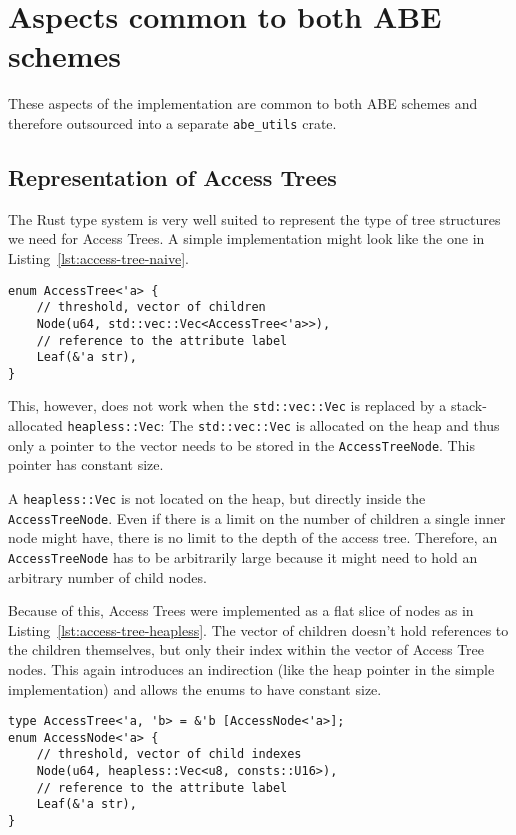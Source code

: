 \section{Aspects common to both ABE schemes}

These aspects of the implementation are common to both ABE schemes and therefore outsourced into a separate \verb+abe_utils+ crate.

\subsection{Representation of Access Trees}
The Rust type system is very well suited to represent the type of tree structures we need for Access Trees.
A simple implementation might look like the one in Listing~\ref{lst:access-tree-naive}. 

\begin{lstlisting}[caption={Simple Implementation of Access Trees (using the standard library)},label={lst:access-tree-naive}]
enum AccessTree<'a> {
    // threshold, vector of children
    Node(u64, std::vec::Vec<AccessTree<'a>>),
    // reference to the attribute label
    Leaf(&'a str),
}
\end{lstlisting}

This, however, does not work when the \texttt{std::vec::Vec} is replaced by a stack-allocated \texttt{heapless::Vec}:
The \texttt{std::vec::Vec} is allocated on the heap and thus only a pointer to the vector needs to be stored in the \texttt{AccessTreeNode}.
This pointer has constant size.

A \texttt{heapless::Vec} is not located on the heap, but directly inside the \texttt{AccessTreeNode}.
Even if there is a limit on the number of children a single inner node might have, there is no limit to the depth of the access tree.
Therefore, an \texttt{AccessTreeNode} has to be arbitrarily large because it might need to hold an arbitrary number of child nodes.

Because of this, Access Trees were implemented as a flat slice of nodes as in Listing~\ref{lst:access-tree-heapless}. 
The vector of children doesn't hold references to the children themselves, but only their index within the vector of Access Tree nodes.
This again introduces an indirection (like the heap pointer in the simple implementation) and allows the enums to have constant size.

\begin{lstlisting}[caption={Refined implementation of Access Trees (works without standard library)},label={lst:access-tree-heapless}]
type AccessTree<'a, 'b> = &'b [AccessNode<'a>];
enum AccessNode<'a> {
    // threshold, vector of child indexes
    Node(u64, heapless::Vec<u8, consts::U16>),
    // reference to the attribute label
    Leaf(&'a str),
}
\end{lstlisting}

